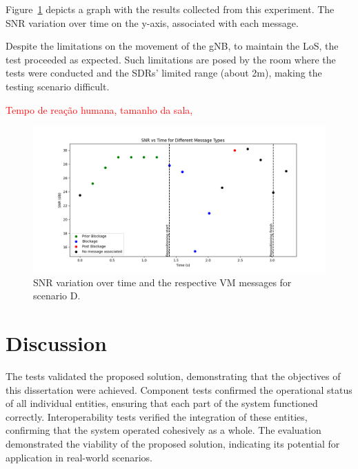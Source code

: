 Figure~\ref{fig:results_3} depicts a graph with the results collected from this experiment.
The SNR variation over time on the y-axis, associated with each message.

Despite the limitations on the movement of the gNB, to maintain the LoS, the test proceeded as expected.
Such limitations are posed by the room where the tests were conducted and the SDRs' limited range (about 2m), making the testing scenario difficult.

\textcolor{red}{Tempo de reação humana, tamanho da sala, }


\begin{figure}[H]
    \centering
    \includegraphics[width=\linewidth]{figures/results_3}
    \caption{SNR variation over time and the respective VM messages for scenario D.}
    \label{fig:results_3}
\end{figure}




\section{Discussion}\label{sec:discuss}
The tests validated the proposed solution, demonstrating that the objectives of this dissertation were achieved.
Component tests confirmed the operational status of all individual entities, ensuring that each part of the system functioned correctly.
Interoperability tests verified the integration of these entities, confirming that the system operated cohesively as a whole.
The evaluation demonstrated the viability of the proposed solution, indicating its potential for application in real-world scenarios.


